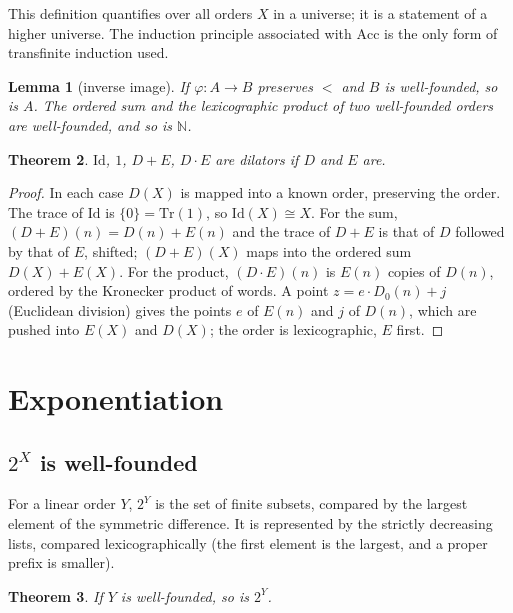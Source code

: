 \documentclass[11pt,a4paper]{article}
\newtheorem{theorem}{Theorem}[section]
\newtheorem{lemma}[theorem]{Lemma}
\theoremstyle{definition}
\theoremstyle{remark}
\newcommand{\Tr}{\mathrm{Tr}}
\newcommand{\Acc}{\mathrm{Acc}}
\newcommand{\N}{\mathbb{N}}
\begin{document}
This definition quantifies over all orders $X$ in a universe; it is a
statement of a higher universe. The induction principle associated with
$\Acc$ is the only form of transfinite induction used.

\begin{lemma}[inverse image]
If $\varphi : A \to B$ preserves $<$ and $B$ is well-founded, so is $A$.
The ordered sum and the lexicographic product of two well-founded orders
are well-founded, and so is $\N$.
\end{lemma}

\begin{theorem}\label{th:poly}
$\mathrm{Id}$, $1$, $D + E$, $D \cdot E$ are dilators if $D$ and $E$ are.
\end{theorem}

\begin{proof}
In each case $D(X)$ is mapped into a known order, preserving the order.
The trace of $\mathrm{Id}$ is $\{0\} = \Tr(1)$, so $\mathrm{Id}(X) \cong
X$. For the sum, $(D + E)(n) = D(n) + E(n)$ and the trace of $D + E$ is
that of $D$ followed by that of $E$, shifted; $(D+E)(X)$ maps into the
ordered sum $D(X) + E(X)$. For the product, $(D \cdot E)(n)$ is $E(n)$
copies of $D(n)$, ordered by the Kronecker product of words. A point
$z = e \cdot D_0(n) + j$ (Euclidean division) gives the points $e$ of
$E(n)$ and $j$ of $D(n)$, which are pushed into $E(X)$ and $D(X)$; the
order is lexicographic, $E$ first.
\end{proof}

\section{Exponentiation}

\subsection{$2^X$ is well-founded}

For a linear order $Y$, $2^Y$ is the set of finite subsets, compared by
the largest element of the symmetric difference. It is represented by the
strictly decreasing lists, compared lexicographically (the first element
is the largest, and a proper prefix is smaller).

\begin{theorem}\label{th:2X}
If $Y$ is well-founded, so is $2^Y$.
\end{theorem}
\end{document}
